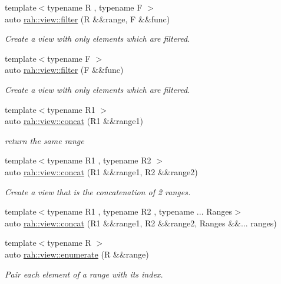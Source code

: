 \begin{DoxyCompactItemize}
{\footnotesize template$<$typename R , typename F $>$ }\\auto \mbox{\hyperlink{namespacerah_1_1view_a1eade9e2861e5bdae07b01ac9bf2c10c}{rah\+::view\+::filter}} (R \&\&range, F \&\&func)
\begin{DoxyCompactList}\small\item\em Create a view with only elements which are filtered. \end{DoxyCompactList}\item 
{\footnotesize template$<$typename F $>$ }\\auto \mbox{\hyperlink{namespacerah_1_1view_a315ba2143c833b24d05481c68b6cf2da}{rah\+::view\+::filter}} (F \&\&func)
\begin{DoxyCompactList}\small\item\em Create a view with only elements which are filtered. \end{DoxyCompactList}\item 
{\footnotesize template$<$typename R1 $>$ }\\auto \mbox{\hyperlink{namespacerah_1_1view_ad7cd13dd36976288286478b47c3f5747}{rah\+::view\+::concat}} (R1 \&\&range1)
\begin{DoxyCompactList}\small\item\em return the same range \end{DoxyCompactList}\item 
{\footnotesize template$<$typename R1 , typename R2 $>$ }\\auto \mbox{\hyperlink{namespacerah_1_1view_a114597b820b9ca8f3c286f026f818399}{rah\+::view\+::concat}} (R1 \&\&range1, R2 \&\&range2)
\begin{DoxyCompactList}\small\item\em Create a view that is the concatenation of 2 ranges. \end{DoxyCompactList}\item 
{\footnotesize template$<$typename R1 , typename R2 , typename ... Ranges$>$ }\\auto \mbox{\hyperlink{namespacerah_1_1view_a830061cf022e907eefb65aba6a35573d}{rah\+::view\+::concat}} (R1 \&\&range1, R2 \&\&range2, Ranges \&\&... ranges)
\item 
{\footnotesize template$<$typename R $>$ }\\auto \mbox{\hyperlink{namespacerah_1_1view_a420160b047554df1bf986946050238ed}{rah\+::view\+::enumerate}} (R \&\&range)
\begin{DoxyCompactList}\small\item\em Pair each element of a range with its index. \end{DoxyCompactList}\item 

\end{DoxyCompactItemize}
